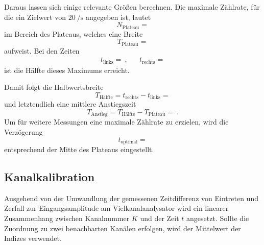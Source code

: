 Daraus lassen sich einige relevante Größen berechnen. Die maximale Zählrate, für die ein Zielwert von $\qty{20}{\per\second}$
angegeben ist, lautet
\begin{equation*}
	N_\text{Plateau} = 
\end{equation*}
im Bereich des Plateaus, welches eine Breite
\begin{equation*}
	T_\text{Plateau} = 
\end{equation*}
aufweist. Bei den Zeiten
\begin{align*}
	t_\text{links} =  \: , && t_\text{rechts} = 
\end{align*}
ist die Hälfte dieses Maximums erreicht.

Damit folgt die Halbwertsbreite
\begin{equation*}
	T_\text{Hälfte} = t_\text{rechts} - t_\text{links} = 
\end{equation*}
und letztendlich eine mittlere Anstiegszeit
\begin{equation*}
	T_\text{Anstieg} = T_\text{Hälfte} - T_\text{Plateau} =  \: .
\end{equation*}
Um für weitere Messungen eine maximale Zählrate zu erzielen, wird die Verzögerung
\begin{equation*}
	t_\text{optimal} = 
\end{equation*}
entsprechend der Mitte des Plateaus eingestellt.



\subsection{Kanalkalibration}

Ausgehend von der Umwandlung der gemessenen Zeitdifferenz von Eintreten und Zerfall zur Eingangsamplitude am
Vielkanalanalysator wird ein linearer Zusammenhang zwischen Kanalnummer $K$ und der Zeit $t$ angesetzt. Sollte
die Zuordnung zu zwei benachbarten Kanälen erfolgen, wird der Mittelwert der Indizes verwendet.

